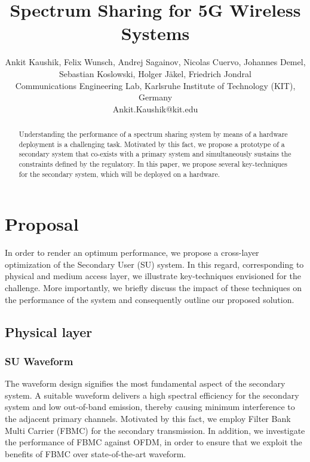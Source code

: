 \documentclass[conference, twocolumn]{IEEEtran}
\begin{document}
%
\title{Spectrum Sharing for 5G Wireless Systems}
\author{Ankit Kaushik, Felix Wunsch, Andrej Sagainov, Nicolas Cuervo, Johannes Demel, \\ Sebastian Koslowski, Holger Jäkel, Friedrich Jondral \\
Communications Engineering Lab, Karlsruhe Institute of Technology (KIT), Germany \\
{Ankit.Kaushik@kit.edu}}
\maketitle
\thispagestyle{empty}
\pagestyle{empty}
\begin{abstract}
Understanding the performance of a spectrum sharing system by means of a hardware deployment is a challenging task. Motivated by this fact, we propose a prototype of a secondary system that co-exists with a primary system and simultaneously sustains the constraints defined by the regulatory. In this paper, we propose several key-techniques for the secondary system, which will be deployed on a hardware. 
\end{abstract}
\vspace{-3mm}
\section{Proposal} \label{sec:prop}
In order to render an optimum performance, we propose a cross-layer optimization of the Secondary User (SU) system. In this regard, corresponding to physical and medium access layer, we illustrate key-techniques envisioned for the challenge. More importantly, we briefly discuss the impact of these techniques on the performance of the system and consequently outline our proposed solution. 
\vspace{-3mm}
\subsection{Physical layer}
\subsubsection{SU Waveform}
The waveform design signifies the most fundamental aspect of the secondary system. A suitable waveform delivers a high spectral efficiency for the secondary system and low out-of-band emission, thereby causing minimum interference to the adjacent primary channels. Motivated by this fact, we employ Filter Bank Multi Carrier (FBMC) for the secondary transmission. In addition, we investigate the performance of FBMC against OFDM, in order to ensure that we exploit the benefits of FBMC over state-of-the-art waveform. 
\end{document}
